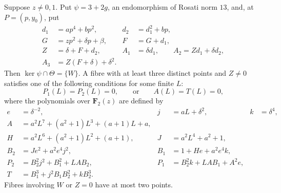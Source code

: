 \begin{lemma}
\label{lem:uniform-thirteen-generic-fibres-candidate}
Suppose $z\ne0,1$. Put $\psi=3+2g$, an endomorphism of Rosati norm
$13$, and, at $P=(p,y_0)$, put
\[
\begin{aligned}
 d_1&=ap^4+bp^2,&d_2&=d_1^2+bp,\\
 G&=zp^2+\delta p+\beta,&F&=G+d_1,\\
 Z&=\delta+F+d_2,&
 A_1&=\delta d_1,\qquad A_2=Zd_1+\delta d_2,\\
 A_3&=Z(F+\delta)+\delta^2.
\end{aligned}
\tag{T13.1}
\]
Then $\ker\psi\cap\Theta=\{W\}$. A fibre with at least three
distinct points and $Z\ne0$ satisfies one of the following conditions
for some finite $L$:
\[
 P_1(L)=P_2(L)=0,\qquad\text{or}\qquad A(L)=T(L)=0,
\tag{T13.2}
\]
where the polynomials over $\mathbf F_2(z)$ are defined by
\[
\begin{aligned}
 e&=\delta^{-2},&j&=aL+\delta^2,&k&=\delta^4,\\
 A&=a^2L^7+(a^2+1)L^3+(a+1)L+a,\\
 H&=a^2L^6+(a^2+1)L^2+(a+1),&J&=a^2L^4+a^2+1,\\
 B_2&=Je^2+a^2e^4j^2,&B_1&=1+He+a^2e^4k,\\
 P_2&=B_2^2j^2+B_1^2+LA B_2,&
 P_1&=B_2^2k+LA B_1+A^2e,\\
 T&=B_1^3+j^2B_1B_2^2+kB_2^3.
\end{aligned}
\tag{T13.3}
\]
Fibres involving $W$ or $Z=0$ have at most two points.
\end{lemma}
